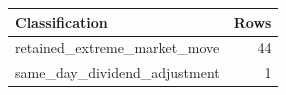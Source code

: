 \begin{tabular}{@{}lr@{}}
\toprule
Classification & Rows \\
\midrule
retained\_\allowbreak{}extreme\_\allowbreak{}market\_\allowbreak{}move & 44 \\
same\_\allowbreak{}day\_\allowbreak{}dividend\_\allowbreak{}adjustment & 1 \\
\bottomrule
\end{tabular}
